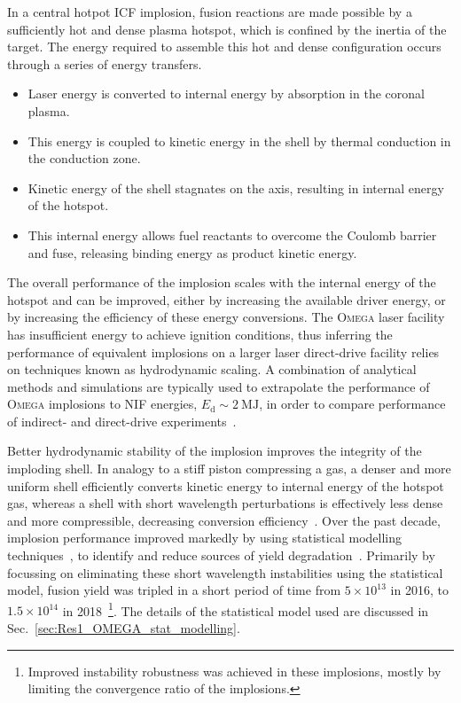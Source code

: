 In a central hotpot \ac{ICF} implosion, fusion reactions are made possible by a sufficiently hot and dense plasma hotspot, which is confined by the inertia of the target.
The energy required to assemble this hot and dense configuration occurs through a series of energy transfers.
\begin{itemize}
    \item Laser energy is converted to internal energy by absorption in the coronal plasma.
    \item This energy is coupled to kinetic energy in the shell by thermal conduction in the conduction zone.
    \item Kinetic energy of the shell stagnates on the axis, resulting in internal energy of the hotspot.
    \item This internal energy allows fuel reactants to overcome the Coulomb barrier and fuse, releasing binding energy as product kinetic energy.
\end{itemize}
The overall performance of the implosion scales with the internal energy of the hotspot and can be improved, either by increasing the available driver energy, or by increasing the efficiency of these energy conversions.
The \textsc{Omega} laser facility has insufficient energy to achieve ignition conditions, thus inferring the performance of equivalent implosions on a larger laser direct-drive facility relies on techniques known as hydrodynamic scaling.
A combination of analytical methods and simulations are typically used to extrapolate the performance of \textsc{Omega} implosions to \ac{NIF} energies, $E_{\text{d}}\sim2\ \text{MJ}$, in order to compare performance of indirect- and direct-drive experiments~\cite{zhou_hydrodynamic_2007}.

Better hydrodynamic stability of the implosion improves the integrity of the imploding shell.
In analogy to a stiff piston compressing a gas, a denser and more uniform shell efficiently converts kinetic energy to internal energy of the hotspot gas, whereas a shell with short wavelength perturbations is effectively less dense and more compressible, decreasing conversion efficiency~\cite{betti_deceleration_2002}.
Over the past decade, implosion performance improved markedly by using statistical modelling techniques~\cite{lees_experimentally_2021}, to identify and reduce sources of yield degradation~\cite{lees_understanding_2023}.
Primarily by focussing on eliminating these short wavelength instabilities using the statistical model, fusion yield was tripled in a short period of time from $5\times10^{13}$ in 2016, to $1.5\times10^{14}$ in 2018~\cite{gopalaswamy_tripled_2019}\footnote{Improved instability robustness was achieved in these implosions, mostly by limiting the convergence ratio of the implosions.}.
The details of the statistical model used are discussed in Sec.~\ref{sec:Res1_OMEGA_stat_modelling}.

